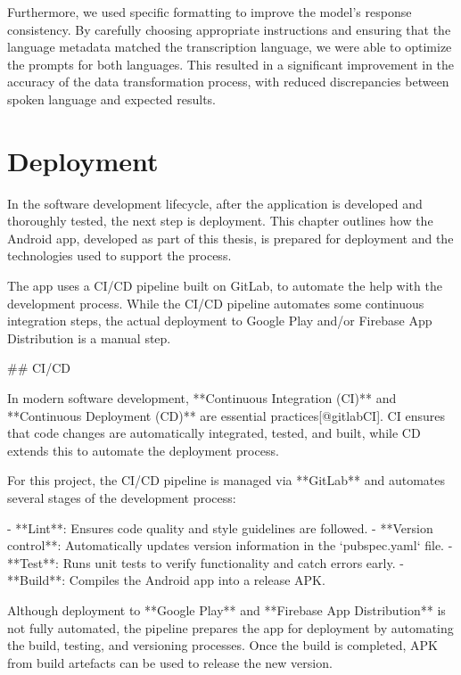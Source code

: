\documentclass[
  digital,     %
  oneside,     %
  nosansbold,  %
  nocolorbold, %
  lof,         %
  lot,         %
]{fithesis4}
\begin{document}
\begin{markdown}
Furthermore, we used specific formatting to improve the model’s response consistency. By carefully choosing appropriate instructions and ensuring that the language metadata matched the transcription language, we were able to optimize the prompts for both languages. This resulted in a significant improvement in the accuracy of the data transformation process, with reduced discrepancies between spoken language and expected results.

\end{markdown}
\shorthandon{-}

\chapter{Deployment}
\shorthandoff{-}
\begin{markdown}

In the software development lifecycle, after the application is developed and thoroughly tested, the next step is deployment. This chapter outlines how the Android app, developed as part of this thesis, is prepared for deployment and the technologies used to support the process.

The app uses a CI/CD pipeline built on GitLab, to automate the help with the development process.  While the CI/CD pipeline automates some continuous integration steps, the actual deployment to Google Play and/or Firebase App Distribution is a manual step.

## CI/CD

In modern software development, **Continuous Integration (CI)** and **Continuous Deployment (CD)** are essential practices[@gitlabCI]. CI ensures that code changes are automatically integrated, tested, and built, while CD extends this to automate the deployment process.

For this project, the CI/CD pipeline is managed via **GitLab** and automates several stages of the development process:

- **Lint**: Ensures code quality and style guidelines are followed.
- **Version control**: Automatically updates version information in the `pubspec.yaml` file.
- **Test**: Runs unit tests to verify functionality and catch errors early.
- **Build**: Compiles the Android app into a release APK.

Although deployment to **Google Play** and **Firebase App Distribution** is not fully automated, the pipeline prepares the app for deployment by automating the build, testing, and versioning processes. Once the build is completed, APK from build artefacts can be used to release the new version.


\end{markdown}
\end{document}
